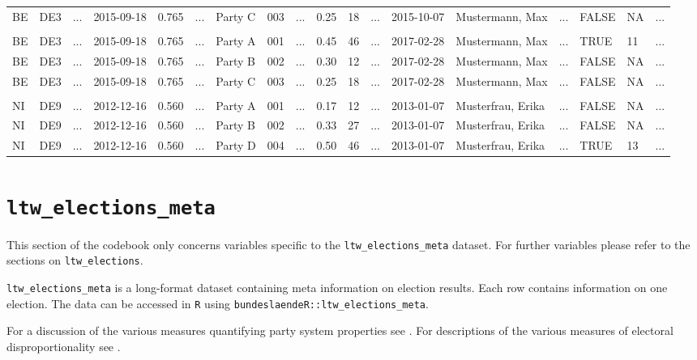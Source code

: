 \documentclass[
]{scrartcl}
\begin{document}
\begin{landscape}
\begin{table}
{\begin{tabular}{llrllrllrllrllrllr}
        BE & DE3 & ... & 2015-09-18 & 0.765 & ... & Party C & 003 & ... & 0.25 & 18 & ...& 2015-10-07 & Mustermann, Max & ... & FALSE & NA & ... \\
        &&&&&&&&&&&\\[-2ex]
        BE & DE3 & ... & 2015-09-18 & 0.765 & ... & Party A & 001 & ... & 0.45 & 46 & ... & 2017-02-28 & Mustermann, Max & ... & TRUE & 11 & ... \\
        BE & DE3 & ... & 2015-09-18 & 0.765 & ... & Party B & 002 & ... & 0.30 & 12 & ... & 2017-02-28 & Mustermann, Max & ... & FALSE & NA & ...\\
        BE & DE3 & ... & 2015-09-18 & 0.765 & ... & Party C & 003 & ... & 0.25 & 18 & ... & 2017-02-28 & Mustermann, Max & ... & FALSE & NA & ...\\
        &&&&&&&&&&&\\
        NI & DE9 & ... & 2012-12-16 & 0.560 & ... & Party A & 001 & ... & 0.17 & 12 & ... & 2013-01-07 & Musterfrau, Erika & ... & FALSE & NA & ...\\
        NI & DE9 & ... & 2012-12-16 & 0.560 & ... & Party B & 002 & ... & 0.33 & 27 & ... & 2013-01-07 & Musterfrau, Erika & ... & FALSE & NA & ...\\
        NI & DE9 & ... & 2012-12-16 & 0.560 & ... & Party D & 004 & ... & 0.50 & 46 & ... & 2013-01-07 & Musterfrau, Erika & ... & TRUE & 13 & ...\\
        \bottomrule
\end{tabular}}
\end{table}

\end{landscape}

\newpage

\section{\texorpdfstring{\texttt{ltw\_elections\_meta}}{ltw\_elections\_meta}}\label{ltw_elections_meta}

This section of the codebook only concerns variables specific to the
\texttt{ltw\_elections\_meta} dataset. For further variables please
refer to the sections on \texttt{ltw\_elections}.

\texttt{ltw\_elections\_meta} is a long-format dataset containing meta
information on election results. Each row contains information on one
election. The data can be accessed in \texttt{R} using
\texttt{bundeslaendeR::ltw\_elections\_meta}.

For a discussion of the various measures quantifying party system
properties see \textcite{niedermayerAnalyseParteiensystemen2013}. For
descriptions of the various measures of electoral disproportionality see
\textcite{karpovMeasurementDisproportionalityProportional2008}.
\end{document}
